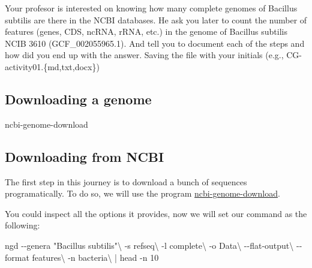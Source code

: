 \documentclass[
  letterpaper,
]{scrbook}
\newenvironment{Shaded}{\begin{snugshade}}{\end{snugshade}}
\newcommand{\AttributeTok}[1]{\textcolor[rgb]{0.40,0.46,0.14}{#1}}
\newcommand{\DataTypeTok}[1]{\textcolor[rgb]{0.68,0.00,0.00}{#1}}
\newcommand{\ExtensionTok}[1]{\textcolor[rgb]{0.00,0.46,0.62}{#1}}
\newcommand{\FunctionTok}[1]{\textcolor[rgb]{0.28,0.35,0.67}{#1}}
\newcommand{\KeywordTok}[1]{\textcolor[rgb]{0.00,0.46,0.62}{#1}}
\newcommand{\NormalTok}[1]{\textcolor[rgb]{0.00,0.46,0.62}{#1}}
\newcommand{\StringTok}[1]{\textcolor[rgb]{0.13,0.47,0.30}{#1}}
\begin{document}
Your profesor is interested on knowing how many complete genomes of
Bacillus subtilis are there in the NCBI databases. He ask you later to
count the number of features (genes, CDS, ncRNA, rRNA, etc.) in the
genome of Bacillus subtilis NCIB 3610 (GCF\_002055965.1). And tell you
to document each of the steps and how did you end up with the answer.
Saving the file with your initials (e.g., CG-activity01.\{md,txt,docx\})

\hypertarget{downloading-a-genome}{%
\subsection*{Downloading a genome}\label{downloading-a-genome}}

\begin{Shaded}
\begin{Highlighting}[]
\ExtensionTok{ncbi{-}genome{-}download}
\end{Highlighting}
\end{Shaded}

\hypertarget{downloading-from-ncbi}{%
\subsection*{Downloading from NCBI}\label{downloading-from-ncbi}}

The first step in this journey is to download a bunch of sequences
programatically. To do so, we will use the program
\href{https://github.com/kblin/ncbi-genome-download}{ncbi-genome-download}.

You could inspect all the options it provides, now we will set our
command as the following:

\begin{Shaded}
\begin{Highlighting}[]
\ExtensionTok{ngd} \AttributeTok{{-}{-}genera} \StringTok{"Bacillus subtilis"}\DataTypeTok{\textbackslash{}}
    \AttributeTok{{-}s}\NormalTok{ refseq}\DataTypeTok{\textbackslash{}}
    \AttributeTok{{-}l}\NormalTok{ complete}\DataTypeTok{\textbackslash{}}
    \AttributeTok{{-}o}\NormalTok{ Data}\DataTypeTok{\textbackslash{}}
    \AttributeTok{{-}{-}flat{-}output}\DataTypeTok{\textbackslash{}}
    \AttributeTok{{-}{-}format}\NormalTok{ features}\DataTypeTok{\textbackslash{}}
    \AttributeTok{{-}n}\NormalTok{ bacteria}\DataTypeTok{\textbackslash{}}
    \KeywordTok{|} \FunctionTok{head} \AttributeTok{{-}n}\NormalTok{ 10}
\end{Highlighting}
\end{Shaded}
\end{document}
